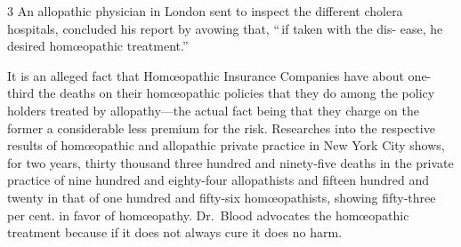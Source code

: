 \documentclass[10pt]{article}
\begin{document}
\begin{multicols}{3}
	An allopathic physician in London sent to inspect the different
	cholera\linebreak
	hospitals, concluded his report by avowing that, ``\,if taken with
	the dis-\linebreak
	ease, he desired hom{\oe}opathic treatment.''

	It is an alleged fact that Hom{\oe}opathic Insurance Companies have\linebreak
	about one-third the deaths on their hom{\oe}opathic policies that
	they do\linebreak
	among the policy holders treated by allopathy---the actual fact
	being that\linebreak
	they charge on the former a considerable less premium for the risk.\linebreak
	Researches into the respective results of hom{\oe}opathic and
	allopathic private\linebreak
	practice in New York City shows, for two years, thirty thousand three\linebreak
	hundred and ninety-five deaths in the private practice of nine
	hundred and\linebreak
	eighty-four allopathists and fifteen hundred and twenty in that of
	one\linebreak
	hundred and fifty-six hom{\oe}opathists, showing fifty-three per
	cent. in favor\linebreak
	of hom{\oe}opathy. Dr.~Blood advocates the hom{\oe}opathic treatment
	because\linebreak
	if it does not always cure it does no harm.


\end{multicols}
\end{document}
